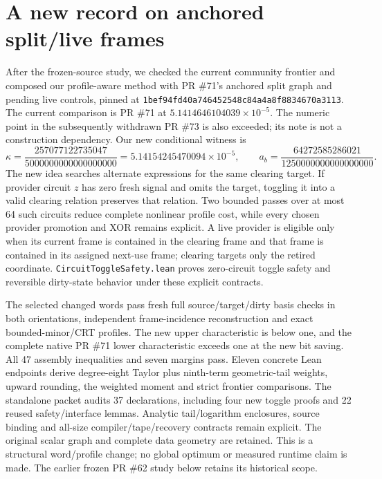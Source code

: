 \documentclass[11pt]{article}
\begin{document}
\section{A new record on anchored split/live frames}
After the frozen-source study, we checked the current community frontier and
composed our profile-aware method with PR \#71's anchored split graph and pending
live controls, pinned at \texttt{1bef94fd40a746452548c84a4a8f8834670a3113}.
The current comparison is PR \#71 at
$5.1414646104039\times10^{-5}$. The numeric point in the subsequently
withdrawn PR \#73 is also exceeded; its note is not a construction dependency.
Our new conditional witness is
\[
 \kappa=\frac{257077122735047}{5000000000000000000}=5.14154245470094\times10^{-5},
 \qquad a_b=\frac{64272585286021}{1250000000000000000}.
\]
The new idea searches alternate expressions for the same clearing target.
If provider circuit $z$ has zero fresh signal and omits the target, toggling
it into a valid clearing relation preserves that relation. Two bounded passes
over at most 64 such circuits reduce complete nonlinear profile cost, while
every chosen provider promotion and XOR remains explicit. A live provider is
eligible only when its current frame is contained in the clearing frame and
that frame is contained in its assigned next-use frame; clearing targets only
the retired coordinate. \texttt{CircuitToggleSafety.lean} proves zero-circuit
toggle safety and reversible dirty-state behavior under these explicit contracts.

The selected changed words pass fresh full source/target/dirty basis checks in
both orientations, independent frame-incidence reconstruction and exact
bounded-minor/CRT profiles. The new upper characteristic is below one, and
the complete native PR \#71 lower characteristic exceeds one at the new bit
saving. All 47 assembly inequalities and seven margins pass. Eleven concrete
Lean endpoints derive degree-eight Taylor plus ninth-term geometric-tail
weights, upward rounding, the weighted moment and strict frontier comparisons.
The standalone packet audits 37 declarations, including four new toggle proofs
and 22 reused safety/interface lemmas. Analytic tail/logarithm enclosures,
source binding and all-size compiler/tape/recovery contracts remain explicit.
The original scalar graph and complete data geometry are retained. This is a
structural word/profile change; no global optimum or measured runtime claim
is made. The earlier frozen PR \#62 study below retains its historical scope.
\end{document}
